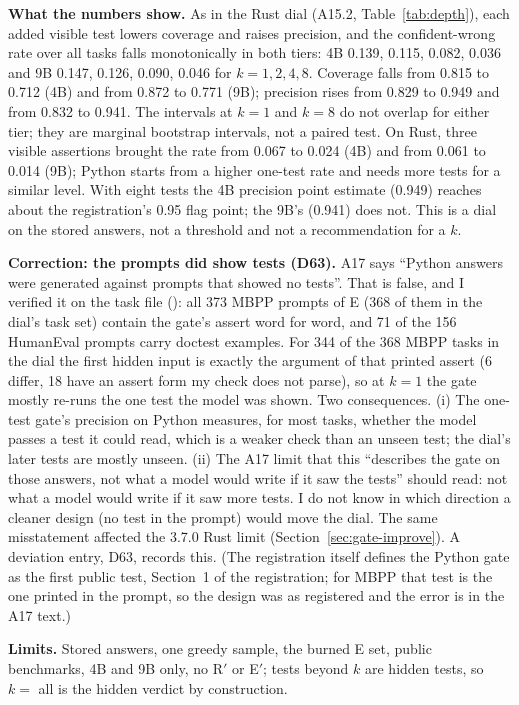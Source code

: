 \documentclass[11pt,a4paper]{article}
\newcommand{\code}[1]{\texttt{\detokenize{#1}}}
\begin{document}
\textbf{What the numbers show.} As in the Rust dial (A15.2, Table~\ref{tab:depth}), each added visible test lowers coverage and raises precision, and the confident-wrong rate over all tasks falls monotonically in both tiers: 4B 0.139, 0.115, 0.082, 0.036 and 9B 0.147, 0.126, 0.090, 0.046 for $k=1,2,4,8$. Coverage falls from 0.815 to 0.712 (4B) and from 0.872 to 0.771 (9B); precision rises from 0.829 to 0.949 and from 0.832 to 0.941. The intervals at $k=1$ and $k=8$ do not overlap for either tier; they are marginal bootstrap intervals, not a paired test. On Rust, three visible assertions brought the rate from 0.067 to 0.024 (4B) and from 0.061 to 0.014 (9B); Python starts from a higher one-test rate and needs more tests for a similar level. With eight tests the 4B precision point estimate (0.949) reaches about the registration's 0.95 flag point; the 9B's (0.941) does not. This is a dial on the stored answers, not a threshold and not a recommendation for a $k$.

\textbf{Correction: the prompts did show tests (D63).} A17 says ``Python answers were generated against prompts that showed no tests''. That is false, and I verified it on the task file (\code{prompt_test_visibility_390.json}): all 373 MBPP prompts of E (368 of them in the dial's task set) contain the gate's assert word for word, and 71 of the 156 HumanEval prompts carry doctest examples. For 344 of the 368 MBPP tasks in the dial the first hidden input is exactly the argument of that printed assert (6 differ, 18 have an assert form my check does not parse), so at $k=1$ the gate mostly re-runs the one test the model was shown. Two consequences. (i) The one-test gate's precision on Python measures, for most tasks, whether the model passes a test it could read, which is a weaker check than an unseen test; the dial's later tests are mostly unseen. (ii) The A17 limit that this ``describes the gate on those answers, not what a model would write if it saw the tests'' should read: not what a model would write if it saw more tests. I do not know in which direction a cleaner design (no test in the prompt) would move the dial. The same misstatement affected the 3.7.0 Rust limit (Section~\ref{sec:gate-improve}). A deviation entry, D63, records this. (The registration itself defines the Python gate as the first public test, Section~1 of the registration; for MBPP that test is the one printed in the prompt, so the design was as registered and the error is in the A17 text.)

\textbf{Limits.} Stored answers, one greedy sample, the burned E set, public benchmarks, 4B and 9B only, no R$'$ or E$'$; tests beyond $k$ are hidden tests, so $k=$ all is the hidden verdict by construction.
\end{document}
